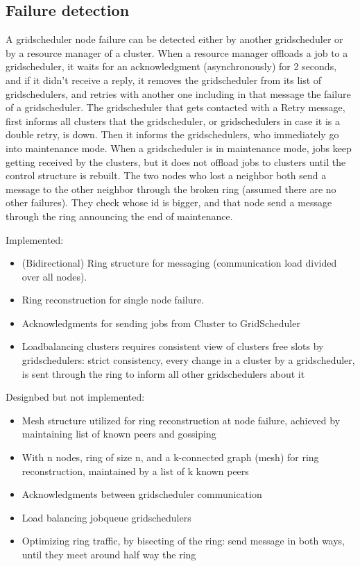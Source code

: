 \documentclass[twocolumn,a4paper]{article}
\begin{document}
\subsection{Failure detection}
A gridscheduler node failure can be detected either by another gridscheduler or by a resource manager of a cluster.
When a resource manager offloads a job to a gridscheduler, it waits for an acknowledgment (asynchronously) for 2 seconds, and if it didn't receive a reply, it removes the gridscheduler from its list of gridschedulers, and retries with another one including in that message the failure of a gridscheduler. The gridscheduler that gets contacted with a Retry message, first informs all clusters that the gridscheduler, or gridschedulers in case it is a double retry, is down. Then it informs the gridschedulers, who immediately go into maintenance mode. When a gridscheduler is in maintenance mode, jobs keep getting received by the clusters, but it does not offload jobs to clusters until the control structure is rebuilt. The two nodes who lost a neighbor both send a message to the other neighbor through the broken ring (assumed there are no other failures). They check whose id is bigger, and that node send a message through the ring announcing the end of maintenance.

Implemented:
\begin{itemize}
	\item (Bidirectional) Ring structure for messaging (communication load divided over all nodes).
	\item Ring reconstruction for single node failure.
	\item Acknowledgments for sending jobs from Cluster to GridScheduler
	\item Loadbalancing clusters requires consistent view of clusters free slots by gridschedulers: strict consistency, every change in a cluster by a gridscheduler, is sent through the ring to inform all other gridschedulers about it
\end{itemize}

Designbed but not implemented:
\begin{itemize}
	\item Mesh structure utilized for ring reconstruction at node failure, achieved by maintaining list of known peers and gossiping
	\item With n nodes, ring of size n, and a k-connected graph (mesh) for ring reconstruction, maintained by a list of k known peers
	\item Acknowledgments between gridscheduler communication
	\item Load balancing jobqueue gridschedulers
	\item Optimizing ring traffic, by bisecting of the ring: send message in both ways, until they meet around half way the ring
\end{itemize}
\end{document}
